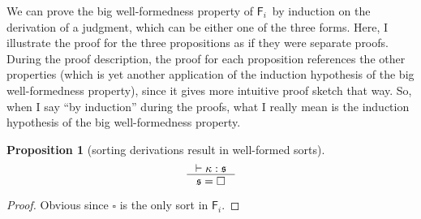 \documentclass[preprint]{sigplanconf}
\newcommand{\Fi}{\ensuremath{\mathsf{F}_i}}
\theoremstyle{plain}
\newtheorem{proposition}{Proposition}
\theoremstyle{remark}
\theoremstyle{definition}
\begin{document}
We can prove the big well-formedness property of \Fi\ by induction on
the derivation of a judgment, which can be either one of the three forms.
Here, I illustrate the proof for the three propositions as if they were
separate proofs. During the proof description, the proof for each proposition
references the other properties (which is yet another application of the
induction hypothesis of the big well-formedness property), since it gives
more intuitive proof sketch that way. So, when I say ``by induction''
during the proofs, what I really mean is the induction hypothesis of
the big well-formedness property.

\begin{proposition}[sorting derivations result in well-formed sorts]
\label{prop:wfsort}
\[ \inference{ |- \kappa : \mathfrak{s} }{ \mathfrak{s}=\square } \]
\end{proposition}
\begin{proof}Obvious since $\square$ is the only sort in \Fi.\end{proof}
\end{document}

